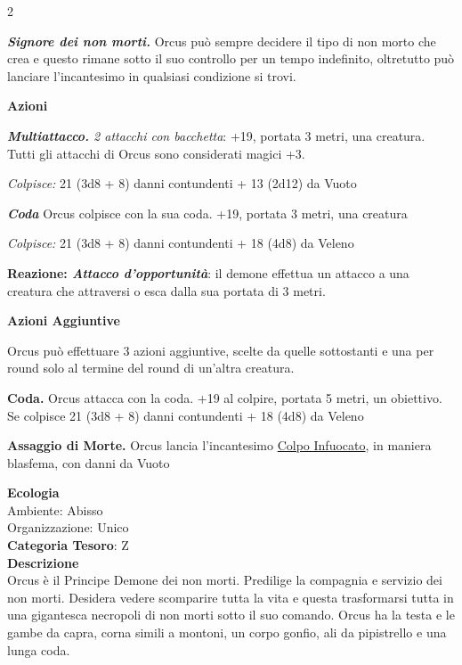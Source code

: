 \begin{multicols}{2}
{\emph{\textbf{Signore dei non morti.}} Orcus può sempre decidere il tipo di non morto che crea e questo rimane sotto il suo controllo per un tempo indefinito, oltretutto può lanciare l'incantesimo in qualsiasi condizione si trovi.

\textbf{Azioni}

\emph{\textbf{Multiattacco.} 2 attacchi con bacchetta}: +19, portata 3 metri, una creatura. Tutti gli attacchi di Orcus sono considerati magici +3.

\emph{Colpisce:} 21 (3d8 + 8) danni contundenti + 13 (2d12) da Vuoto

\emph{\textbf{Coda}} Orcus colpisce con la sua coda. +19, portata 3 metri, una creatura

\emph{Colpisce:} 21 (3d8 + 8) danni contundenti + 18 (4d8) da Veleno

\textbf{Reazione: \emph{Attacco d'opportunità}}: il demone effettua un attacco a una creatura che attraversi o esca dalla sua portata di 3 metri.

\textbf{Azioni Aggiuntive}

Orcus può effettuare 3 azioni aggiuntive, scelte da quelle sottostanti e una per round solo al termine del round di un'altra creatura.

\textbf{Coda.} Orcus attacca con la coda. +19 al colpire, portata 5 metri, un obiettivo. Se colpisce 21 (3d8 + 8) danni contundenti + 18 (4d8) da Veleno

\textbf{Assaggio di Morte.} Orcus lancia l'incantesimo \hyperlink{Colpo Infuocato}{Colpo Infuocato}, in maniera blasfema, con danni da Vuoto

\textbf{Ecologia}\\
Ambiente: Abisso\\
Organizzazione: Unico\\
\textbf{Categoria Tesoro}: Z\\
\textbf{Descrizione}\\
Orcus è il Principe Demone dei non morti. Predilige la compagnia e servizio dei non morti. Desidera vedere scomparire tutta la vita e questa trasformarsi tutta in una gigantesca necropoli di non morti sotto il suo comando. Orcus ha la testa e le gambe da capra, corna simili a montoni, un corpo gonfio, ali da pipistrello e una lunga coda.

}
\end{multicols}
